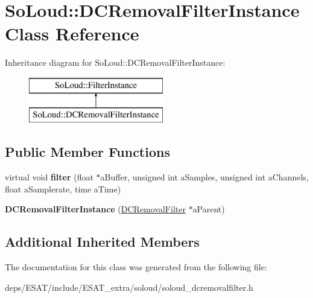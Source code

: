 \hypertarget{class_so_loud_1_1_d_c_removal_filter_instance}{}\section{So\+Loud\+:\+:D\+C\+Removal\+Filter\+Instance Class Reference}
\label{class_so_loud_1_1_d_c_removal_filter_instance}
Inheritance diagram for So\+Loud\+:\+:D\+C\+Removal\+Filter\+Instance\+:\begin{figure}[H]
\begin{center}
\leavevmode
\includegraphics[height=2.000000cm]{class_so_loud_1_1_d_c_removal_filter_instance}
\end{center}
\end{figure}
\subsection*{Public Member Functions}
\begin{DoxyCompactItemize}
\item 
\mbox{\label{class_so_loud_1_1_d_c_removal_filter_instance_aa421cd674e792ea9989de1f0c4e12409}} 
virtual void {\bfseries filter} (float $\ast$a\+Buffer, unsigned int a\+Samples, unsigned int a\+Channels, float a\+Samplerate, time a\+Time)
\item 
\mbox{\label{class_so_loud_1_1_d_c_removal_filter_instance_a761eab639e22ec88ae747a58795a9337}} 
{\bfseries D\+C\+Removal\+Filter\+Instance} (\mbox{\hyperlink{class_so_loud_1_1_d_c_removal_filter}{D\+C\+Removal\+Filter}} $\ast$a\+Parent)
\end{DoxyCompactItemize}
\subsection*{Additional Inherited Members}


The documentation for this class was generated from the following file\+:\begin{DoxyCompactItemize}
\item 
deps/\+E\+S\+A\+T/include/\+E\+S\+A\+T\+\_\+extra/soloud/soloud\+\_\+dcremovalfilter.\+h\end{DoxyCompactItemize}
